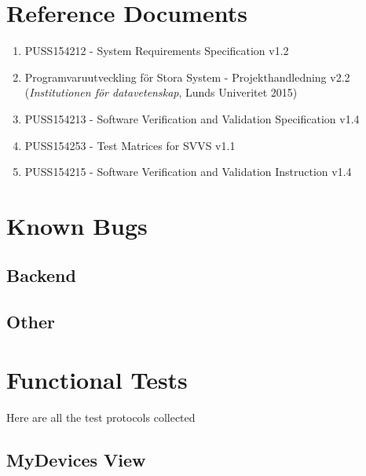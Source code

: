 \documentclass[a4paper]{article}
\begin{document}
\setcounter{tocdepth}{2}
\tableofcontents
\newpage
{}


\section*{Reference Documents}
\begin{enumerate}
\item PUSS154212 - System Requirements Specification v1.2 \label{refdocs:srs} 
\item Programvaruutveckling för Stora System - Projekthandledning v2.2 \newline (\textit{Institutionen för datavetenskap}, Lunds Univeritet 2015) \label{refdocs:projekthandledning}
\item PUSS154213 - Software Verification and Validation Specification v1.4 \label{refdocs:SVVS}
\item PUSS154253 - Test Matrices for SVVS v1.1 \label{refdocs:matrices}
\item PUSS154215 - Software Verification and Validation Instruction v1.4 \label{refdocs:SVVI}
\end{enumerate}

\section{Known Bugs}

\subsection{Backend}

\subsection{Other}

\clearpage
\section{Functional Tests}
Here are all the test protocols collected

\subsection{MyDevices View}



\end{document}
